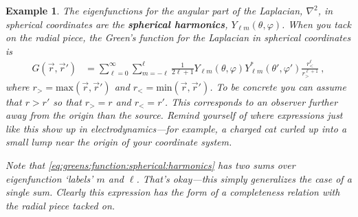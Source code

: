 \documentclass[
  11pt,
	colorful,
	raggedright,
]{tufte-style-thesis-flip}
\newtheorem{example}{Example}[section]
\begin{document}

\begin{example}
The eigenfunctions for the angular part of the Laplacian, $\nabla^2$, in spherical coordinates are the \textbf{spherical harmonics}, $Y_{\ell m}(\theta, \varphi)$. When you tack on the radial piece, the Green's function for the Laplacian in spherical coordinates is
\begin{align}
  G(\vec{r},\vec{r}')
  &=
  \sum_{\ell=0}^\infty
  \sum_{m=-\ell}^\ell
  \frac{1}{2\ell+1}
  Y_{\ell m}(\theta, \varphi)
  Y_{\ell m}^*(\theta', \varphi')
  \frac{r_<^\ell}{r_>^{\ell+1}} \ ,
  \label{eq:greens:function:spherical:harmonics}
\end{align}
where $r_> = \text{max}(\vec{r},\vec{r}')$ and $r_< = \text{min}(\vec{r},\vec{r}')$. To be concrete you can assume that $r > r'$ so that $r_> = r$ and $r_< = r'$. This corresponds to an observer further away from the origin than the source. Remind yourself of where expressions \emph{just like this} show up in electrodynamics---for example, a charged cat curled up into a small lump near the origin of your coordinate system.

Note that \eqref{eq:greens:function:spherical:harmonics} has \emph{two} sums over eigenfunction `labels' $m$ and $\ell$. That's okay---this simply generalizes the case of a single sum. Clearly this expression has the form of a completeness relation with the radial piece tacked on.


\end{example}
\end{document}
